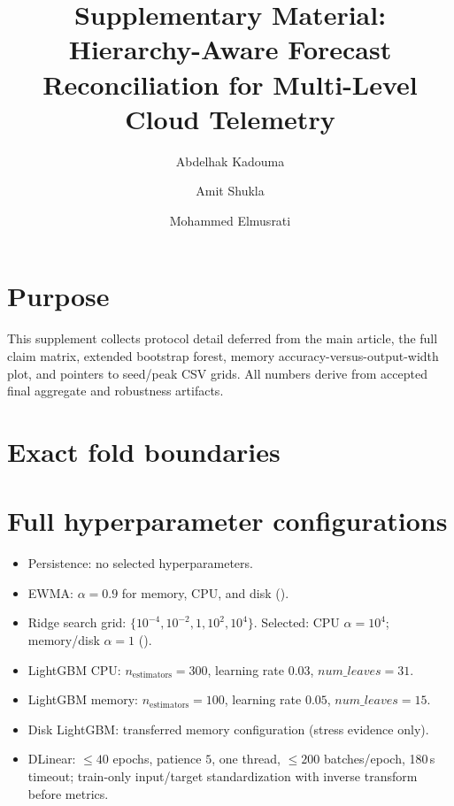 \documentclass[a4paper,fleqn]{cas-dc}
\title[mode=title]{Supplementary Material: Hierarchy-Aware Forecast Reconciliation for Multi-Level Cloud Telemetry}
\author[1]{Abdelhak Kadouma}
\author[1]{Amit Shukla}
\author[1]{Mohammed Elmusrati}
\affiliation[1]{organization={University of Vaasa},
            city={Vaasa},
            country={Finland}}
\begin{document}
\let\WriteBookmarks\relax
\maketitle
\onecolumn

\renewcommand{\thesection}{S\arabic{section}}
\renewcommand{\thefigure}{S\arabic{figure}}
\renewcommand{\thetable}{S\arabic{table}}
\setcounter{section}{0}
\setcounter{figure}{0}
\setcounter{table}{0}

\section{Purpose}
This supplement collects protocol detail deferred from the main article,
the full claim matrix, extended bootstrap forest, memory
accuracy-versus-output-width plot, and pointers to seed/peak CSV grids.
All numbers derive from accepted final aggregate and robustness artifacts.

\section{Exact fold boundaries}


\section{Full hyperparameter configurations}
\begin{itemize}
  \item Persistence: no selected hyperparameters.
  \item {EWMA}: $\alpha=0.9$ for memory, {CPU}, and disk
    ().
  \item Ridge search grid: $\{10^{-4},10^{-2},1,10^{2},10^{4}\}$.
    Selected: {CPU} $\alpha=10^{4}$; memory/disk $\alpha=1$
    ().
  \item LightGBM {CPU}: $n_{\mathrm{estimators}}=300$, learning rate $0.03$,
    $num\_leaves=31$.
  \item LightGBM memory: $n_{\mathrm{estimators}}=100$, learning rate $0.05$,
    $num\_leaves=15$.
  \item Disk LightGBM: transferred memory configuration (stress evidence only).
  \item DLinear: $\le 40$ epochs, patience $5$, one thread,
    $\le 200$ batches/epoch, 180\,s timeout; train-only input/target
    standardization with inverse transform before metrics.
\end{itemize}
\end{document}
